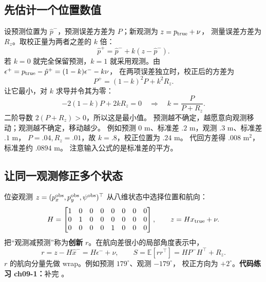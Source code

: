 \subsection{先估计一个位置数值}
设预测位置为 $\hat p^-$，预测误差方差为 $P$；新观测为 $z=p_{\rm true}+\nu$，
测量误差方差为 $R_z$。取校正量为两者之差的 $k$ 倍：
\begin{equation}
\hat p^+=\hat p^-+k(z-\hat p^-).
\end{equation}
若 $k=0$ 就完全保留预测，$k=1$ 就采用观测。由
$\epsilon^+=p_{\rm true}-\hat p^+=(1-k)\epsilon^--k\nu$，
在两项误差独立时，校正后的方差为
\begin{equation}
P^+=(1-k)^2P+k^2R_z.
\end{equation}
让它最小，对 $k$ 求导并令其为零：
\begin{equation}
-2(1-k)P+2kR_z=0\quad\Longrightarrow\quad k=\frac{P}{P+R_z}.
\end{equation}
二阶导数 $2(P+R_z)>0$，所以这是最小值。
预测越不确定，越愿意向观测移动；观测越不确定，移动越少。
例如预测 $0$ m、标准差 $.2$ m，观测 $.3$ m、标准差 $.1$ m，
$P=.04,R_z=.01$，故 $k=.8$，校正位置为 $.24$ m。
代回方差得 $.008$ m$^2$，标准差约 $.0894$ m。
注意输入公式的是标准差的平方。

\begin{center}
\end{center}

\subsection{让同一观测修正多个状态}
位姿观测 $z=(p_x^{\rm obs},p_y^{\rm obs},\psi^{\rm obs})^\top$ 从八维状态中选择位置和航向：
\begin{equation}
H=\begin{bmatrix}1&0&0&0&0&0&0&0\\0&1&0&0&0&0&0&0\\0&0&0&0&1&0&0&0\end{bmatrix},
\qquad z=Hx_{\rm true}+\nu.
\end{equation}
把“观测减预测”称为\textbf{创新} $r$。在航向差很小的局部角度表示中，
\begin{equation}
r=z-H\hat x^-=H\epsilon^-+\nu,\qquad
S=\mathbb E[rr^\top]=HP^-H^\top+R_z.
\end{equation}
$r$ 的航向分量先做 wrap。例如预测 $179^\circ$、观测 $-179^\circ$，
校正方向为 $+2^\circ$。\textbf{代码练习 ch09-1：}补完 。

